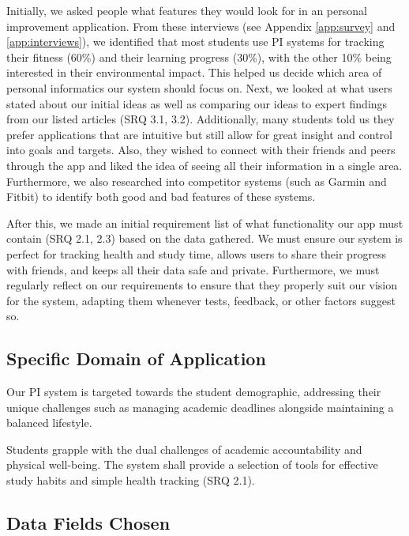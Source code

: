 \documentclass[11pt]{article}
\begin{document}
Initially, we asked people what features they would look for in an personal
improvement application. From these interviews (see Appendix \ref{app:survey}
and \ref{app:interviews}), we identified that most students use PI systems for
tracking their fitness (60\%) and their learning progress (30\%), with the
other 10\% being interested in their environmental impact. This helped us
decide which area of personal informatics our system should focus on. Next, we
looked at what users stated about our initial ideas as well as comparing our
ideas to expert findings from our listed articles (SRQ 3.1, 3.2). Additionally,
many students told us they prefer applications that are intuitive but still
allow for great insight and control into goals and targets. Also, they wished
to connect with their friends and peers through the app and liked the idea of
seeing all their information in a single area. Furthermore, we also researched
into competitor systems (such as Garmin and Fitbit) to identify both good and
bad features of these systems.\par

After this, we made an initial requirement list of what functionality our app must contain (SRQ 2.1, 2.3)
based on the data gathered. We must ensure our system is perfect for tracking
health and study time, allows users to share their progress with friends, and
keeps all their data safe and private. Furthermore, we must regularly reflect on our requirements
to ensure that they properly suit our vision for the system, adapting them whenever tests, feedback, or other factors suggest so.
 

\subsection{Specific Domain of Application}

Our PI system is targeted towards the student demographic,
addressing their unique challenges such as managing academic deadlines
alongside maintaining a balanced lifestyle.\par 

Students grapple with the dual challenges of academic accountability and
physical well-being. The system shall provide a selection of tools for effective
study habits and simple health tracking (SRQ 2.1).
 

\subsection{Data Fields Chosen}
\end{document}
